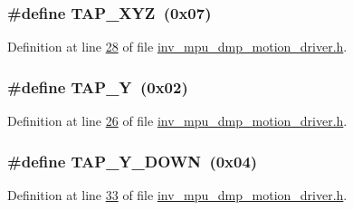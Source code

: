 \subsubsection[{\texorpdfstring{T\+A\+P\+\_\+\+X\+YZ}{TAP_XYZ}}]{\setlength{\rightskip}{0pt plus 5cm}\#define T\+A\+P\+\_\+\+X\+YZ~(0x07)}\hypertarget{group___d_r_i_v_e_r_s_gaa2b8e1661eb53aeac3ff4877ff2b79d9}{}\label{group___d_r_i_v_e_r_s_gaa2b8e1661eb53aeac3ff4877ff2b79d9}


Definition at line \hyperlink{inv__mpu__dmp__motion__driver_8h_source_l00028}{28} of file \hyperlink{inv__mpu__dmp__motion__driver_8h_source}{inv\+\_\+mpu\+\_\+dmp\+\_\+motion\+\_\+driver.\+h}.

\subsubsection[{\texorpdfstring{T\+A\+P\+\_\+Y}{TAP_Y}}]{\setlength{\rightskip}{0pt plus 5cm}\#define T\+A\+P\+\_\+Y~(0x02)}\hypertarget{group___d_r_i_v_e_r_s_ga762f9521bf33c9ba7a77595268b108ec}{}\label{group___d_r_i_v_e_r_s_ga762f9521bf33c9ba7a77595268b108ec}


Definition at line \hyperlink{inv__mpu__dmp__motion__driver_8h_source_l00026}{26} of file \hyperlink{inv__mpu__dmp__motion__driver_8h_source}{inv\+\_\+mpu\+\_\+dmp\+\_\+motion\+\_\+driver.\+h}.

\subsubsection[{\texorpdfstring{T\+A\+P\+\_\+\+Y\+\_\+\+D\+O\+WN}{TAP_Y_DOWN}}]{\setlength{\rightskip}{0pt plus 5cm}\#define T\+A\+P\+\_\+\+Y\+\_\+\+D\+O\+WN~(0x04)}\hypertarget{group___d_r_i_v_e_r_s_ga3d35b3c219083d14f9fff4a9c65cf783}{}\label{group___d_r_i_v_e_r_s_ga3d35b3c219083d14f9fff4a9c65cf783}


Definition at line \hyperlink{inv__mpu__dmp__motion__driver_8h_source_l00033}{33} of file \hyperlink{inv__mpu__dmp__motion__driver_8h_source}{inv\+\_\+mpu\+\_\+dmp\+\_\+motion\+\_\+driver.\+h}.

